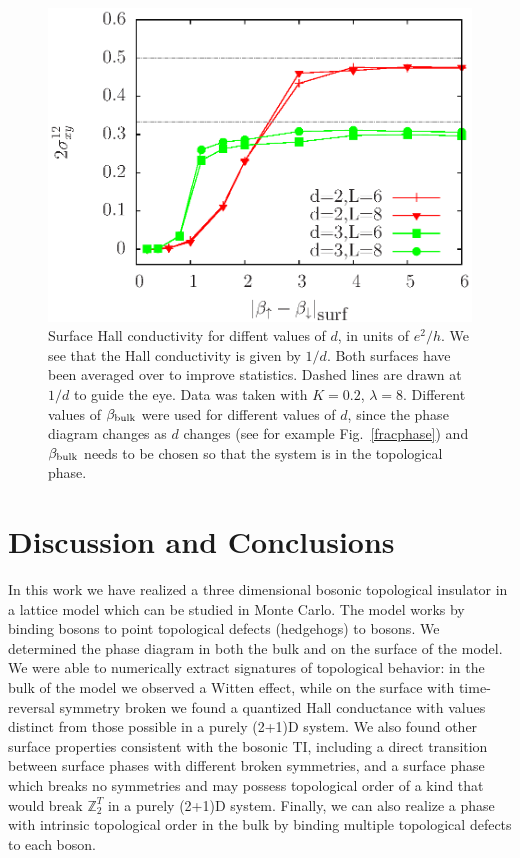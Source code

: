 \documentclass[prb,twocolumn]{revtex4-1}
\def\ztwot{\mathbb{Z}_2^T}
\begin{document}
\begin{figure}
\includegraphics[width=\linewidth]{figures/halldiff.eps}
\caption{Surface Hall conductivity for diffent values of $d$, in units of $e^2/h$. We see that the Hall conductivity is given by $1/d$. Both surfaces have been averaged over to improve statistics. Dashed lines are drawn at $1/d$ to guide the eye. Data was taken with $K=0.2$, $\lambda=8$. Different values of $\beta_{\rm bulk}$ were used for different values of $d$, since the phase diagram changes as $d$ changes (see for example Fig.~\ref{fracphase}) and $\beta_{\rm bulk}$ needs to be chosen so that the system is in the topological phase.
}
\label{halldiff}
\end{figure}


\section{Discussion and Conclusions}
In this work we have realized a three dimensional bosonic topological insulator in a lattice model which can be studied in Monte Carlo. The model works by binding bosons to point topological defects (hedgehogs) to bosons. We determined the phase diagram in both the bulk and on the surface of the model. We were able to numerically extract signatures of topological behavior: in the bulk of the model we observed a Witten effect, while on the surface with time-reversal symmetry broken we found a quantized Hall conductance with values distinct from those possible in a purely (2+1)D system. We also found other surface properties consistent with the bosonic TI, including a direct transition between surface phases with different broken symmetries, and a surface phase which breaks no symmetries and may possess topological order of a kind that would break $\ztwot$ in a purely (2+1)D system. Finally, we can also realize a phase with intrinsic topological order in the bulk by binding multiple topological defects to each boson.
\end{document}
